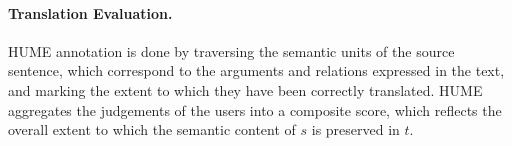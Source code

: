 \documentclass[11pt,letterpaper]{article}
\newcommand{\com}[1]{}
\begin{document}
% 
%
%  


\paragraph{Translation Evaluation.}
HUME annotation is done by traversing the semantic units
of the source sentence, which correspond to the arguments and relations expressed
in the text, and marking the extent to which they have been correctly translated.
HUME aggregates the judgements of the users into a composite score, 
which reflects the overall extent to which the semantic content of $s$ is preserved in $t$.
\end{document}
